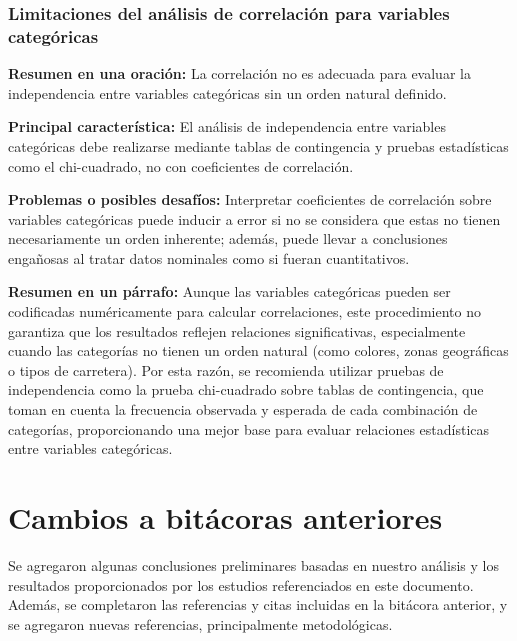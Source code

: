\documentclass{book}
\begin{document}
\subsubsection{Limitaciones del análisis de correlación para variables categóricas}

\textbf{Resumen en una oración:} La correlación no es adecuada para evaluar la independencia entre variables categóricas sin un orden natural definido.

\textbf{Principal característica:} El análisis de independencia entre variables categóricas debe realizarse mediante tablas de contingencia y pruebas estadísticas como el chi-cuadrado, no con coeficientes de correlación.

\textbf{Problemas o posibles desafíos:} Interpretar coeficientes de correlación sobre variables categóricas puede inducir a error si no se considera que estas no tienen necesariamente un orden inherente; además, puede llevar a conclusiones engañosas al tratar datos nominales como si fueran cuantitativos.

\textbf{Resumen en un párrafo:} Aunque las variables categóricas pueden ser codificadas numéricamente para calcular correlaciones, este procedimiento no garantiza que los resultados reflejen relaciones significativas, especialmente cuando las categorías no tienen un orden natural (como colores, zonas geográficas o tipos de carretera). Por esta razón, se recomienda utilizar pruebas de independencia como la prueba chi-cuadrado sobre tablas de contingencia, que toman en cuenta la frecuencia observada y esperada de cada combinación de categorías, proporcionando una mejor base para evaluar relaciones estadísticas entre variables categóricas.

\section{Cambios a bitácoras anteriores}
Se agregaron algunas conclusiones preliminares basadas en nuestro análisis y los resultados proporcionados por los estudios referenciados en este documento. Además, se completaron las referencias y citas incluidas en la bitácora anterior, y se agregaron nuevas referencias, principalmente metodológicas.




\nocite{*}
\end{document}
